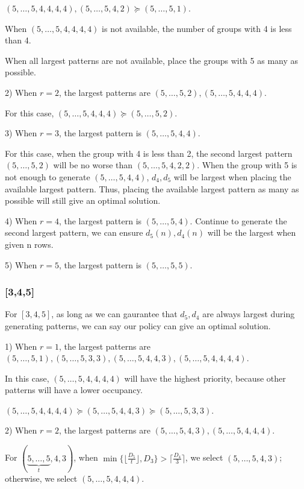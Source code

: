 $(5,\ldots,5,4,4,4,4), (5,\ldots,5,4,2) \succeq (5,\ldots,5,1)$.

When $(5,\ldots,5,4,4,4,4)$ is not available, the number of groups with 4 is less than 4.

When all largest patterns are not available, place the groups with 5 as many as possible.


2) When $r=2$, the largest patterns are $(5,\ldots,5,2), (5,\ldots,5,4,4,4)$.

For this case, $(5,\ldots,5,4,4,4) \succeq (5,\ldots,5,2)$.


3) When $r=3$, the largest pattern is $(5,\ldots,5,4,4)$.

For this case, when the group with 4 is less than 2, the second largest pattern $(5,\ldots,5,2)$ will be no worse than $(5,\ldots,5,4,2,2)$.
When the group with 5 is not enough to generate $(5,\ldots,5,4,4)$, $d_4,d_5$ will be largest when placing the available largest pattern.
Thus, placing the available largest pattern as many as possible will still give an optimal solution.

4) When $r=4$, the largest pattern is $(5,\ldots,5,4)$. Continue to generate the second largest pattern, we can ensure $d_5(n), d_4(n)$ will be the largest when given n rows.

5) When $r=5$, the largest pattern is $(5,\ldots,5,5)$.

\subsubsection{[3,4,5]}

For $[3,4,5]$, as long as we can gaurantee that $d_5,d_4$ are always largest during generating patterns, we can say our policy can give an optimal solution.

1) When $r = 1$, the largest patterns are $(5,\ldots,5,1), (5,\ldots,5,3,3), (5,\ldots,5,4,4,3), (5,\ldots,5,4,4,4,4)$.

In this case, $(5,\ldots,5,4,4,4,4)$ will have the highest priority, because
other patterns will have a lower occupancy.

$(5,\ldots,5,4,4,4,4) \succeq (5,\ldots,5,4,4,3) \succeq (5,\ldots,5,3,3)$.


2) When $r=2$, the largest patterns are $(5,\ldots,5,4,3), (5,\ldots,5,4,4,4)$.

For $(\underbrace{5,\ldots,5}_{t},4,3)$, when $\min\{\lfloor \frac{D_5}{t} \rfloor, D_3\} > \lceil \frac{D_4}{3} \rceil$, we select $(5,\ldots,5,4,3)$; otherwise, we select $(5,\ldots,5,4,4,4)$.

